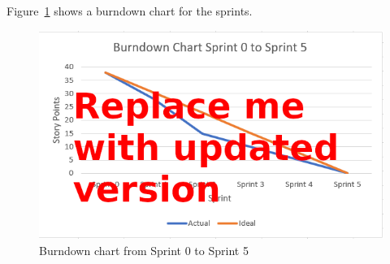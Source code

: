 \documentclass[conference]{IEEEtran}
\begin{document}
Figure~\ref{fig:BurndownChart} shows a burndown chart for the sprints.

\begin{figure}
\begin{center}
\includegraphics[scale=1.05]{Burndown.png}
\caption{Burndown chart from Sprint 0 to Sprint 5}
\label{fig:BurndownChart}
\end{center}
\end{figure}



\end{document}
